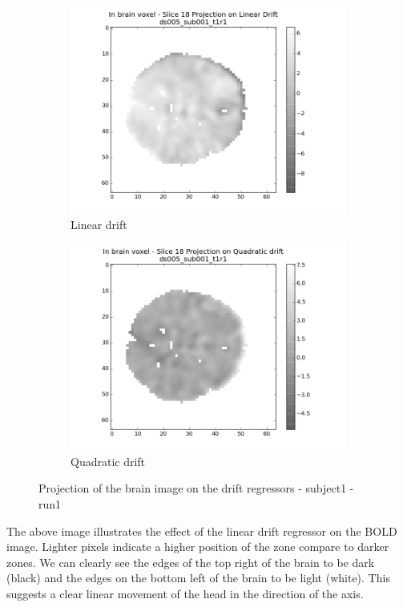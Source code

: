 \begin{figure}[H]
\begin{subfigure}{.5\textwidth}
  \centering
  \includegraphics[width=.9\linewidth]{../fig/drifts/ds005_sub001_t1r1_withdrift_middleslice_5.png}
  \caption{Linear drift}
  \label{fig:drift1}
\end{subfigure}%
\begin{subfigure}{.5\textwidth}
  \centering
  \includegraphics[width=.9\linewidth]{../fig/drifts/ds005_sub001_t1r1_withdrift_middleslice_6.png}
  \caption{Quadratic drift}
  \label{fig:drift2}
\end{subfigure}
\caption{Projection of the brain image on the drift regressors - subject1 - run1}
\label{fig:drifta}
\end{figure}

The above image illustrates the effect of the linear drift regressor on the BOLD image.
Lighter pixels indicate a higher position of the zone compare
to darker zones. We can clearly see the edges of the top right of the brain to be
dark (black) and the edges on the bottom left of the brain to be light (white). 
This suggests a clear linear movement of the head in the direction of the axis. 

